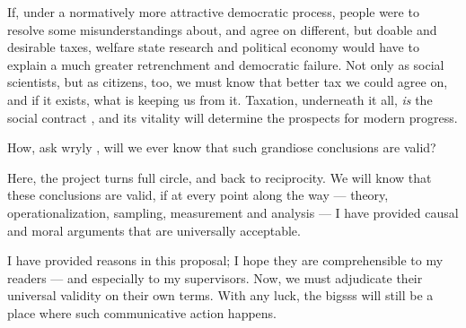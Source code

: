If, under a normatively more attractive democratic process, people were to resolve some misunderstandings about, and agree on different, but doable and desirable taxes, welfare state research and political economy would have to explain a much greater retrenchment and democratic failure.
Not only as social scientists, but as citizens, too, we must know that better tax we could agree on, and if it exists, what is keeping us from it.
Taxation, underneath it all, \emph{is} the social contract \citep{SchumpeterSwedberg-1942-aa}, and its vitality will determine the prospects for modern progress.

How, ask wryly \citet[2]{PrzeworskiSalomon1995}, will we ever know that such grandiose conclusions are valid?

Here, the project turns full circle, and back to reciprocity.
We will know that these conclusions are valid, if at every point along the way --- theory, operationalization, sampling, measurement and analysis --- I have provided causal and moral arguments that are universally acceptable.

I have provided reasons in this proposal;
I hope they are comprehensible to my readers --- and especially to my supervisors.
Now, we must adjudicate their universal validity on their own terms.
With any luck, the \gls{bigsss} will still be a place where such communicative action happens.





